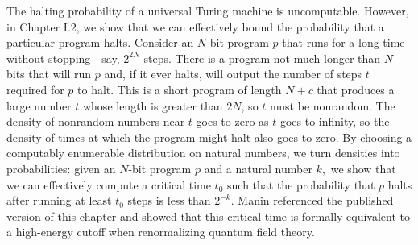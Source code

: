 \documentclass[12pt,twoside,openright]{report}
\begin{document}
The halting probability of a universal Turing machine is uncomputable.  However, in Chapter I.2, we show that we can effectively bound the probability that a particular program halts.  Consider an $N$-bit program $p$ that runs for a long time without stopping---say, $2^{2N}$ steps.  There is a program not much longer than $N$ bits that will run $p$ and, if it ever halts, will output the number of steps $t$ required for $p$ to halt.  This is a short program of length $N + c$ that produces a large number $t$ whose length is greater than $2N$, so $t$ must be nonrandom.  The density of nonrandom numbers near $t$ goes to zero as $t$ goes to infinity, so the density of times at which the program might halt also goes to zero.  By choosing a computably enumerable distribution on natural numbers, we turn densities into probabilities: given an $N$-bit program $p$ and a natural number $k,$ we show that we can effectively compute a critical time $t_0$ such that the probability that $p$ halts after running at least $t_0$ steps is less than $2^{-k}.$  Manin \cite{ManinRenorm2} referenced the published version of this chapter and showed that this critical time is formally equivalent to a high-energy cutoff when renormalizing quantum field theory.
\end{document}

